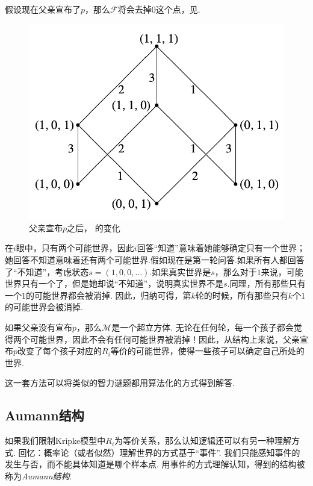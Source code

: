 假设现在父亲宣布了$p$，那么$\mathcal F$将会去掉$0$这个点，见. 
\begin{figure}[ht]
    \centering
    \includegraphics[scale=0.5]{Figures/epistemic-logic/cubic-example-after-father.png}
    \caption{父亲宣布$p$之后， 的变化}
    \label{fig:cubic-example-after-father}
\end{figure}


 在$i$眼中，只有两个可能世界，因此$i$回答“知道”意味着她能够确定只有一个世界；她回答不知道意味着还有两个可能世界.假如现在是第一轮问答.如果所有人都回答了“不知道”，考虑状态$s=(1,0,0,\dots)$.如果真实世界是$s$，那么对于$1$来说，可能世界只有一个了，但是她却说“不知道”，说明真实世界不是$s$.同理，所有那些只有一个$1$的可能世界都会被消掉. 因此，归纳可得，第$k$轮的时候，所有那些只有$k$个$1$的可能世界会被消掉.
 
 如果父亲没有宣布$p$，那么$\mathcal M$是一个超立方体. 无论在任何轮，每一个孩子都会觉得两个可能世界，因此不会有任何可能世界被消掉！因此，从结构上来说，父亲宣布$p$改变了每个孩子对应的$R_i$等价的可能世界，使得一些孩子可以确定自己所处的世界. 
 
这一套方法可以将类似的智力谜题都用算法化的方式得到解答.

\subsection{Aumann结构}

如果我们限制Kripke模型中$R_i$为等价关系，那么认知逻辑还可以有另一种理解方式. 回忆：概率论（或者似然）理解世界的方式基于“事件”. 我们只能感知事件的发生与否，而不能具体知道是哪个样本点. 用事件的方式理解认知，得到的结构被称为\emph{Aumann结构}.

